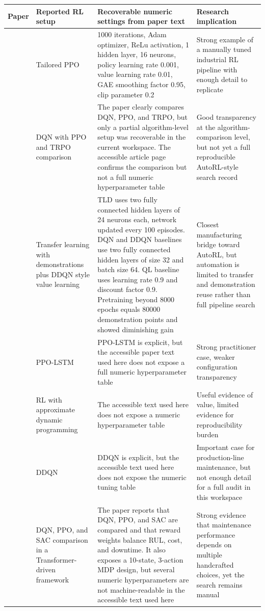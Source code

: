 \begin{table}[htbp]
\centering
\small
\begin{tabular}{p{} p{} p{} p{}}
\hline
Paper & Reported RL setup & Recoverable numeric settings from paper text & Research implication \\
\hline
[Hu24] & Tailored PPO & 1000 iterations, Adam optimizer, ReLu activation, 1 hidden layer, 16 neurons, policy learning rate 0.001, value learning rate 0.01, GAE smoothing factor 0.95, clip parameter 0.2 & Strong example of a manually tuned industrial RL pipeline with enough detail to replicate \\
[Net24] & DQN with PPO and TRPO comparison & The paper clearly compares DQN, PPO, and TRPO, but only a partial algorithm-level setup was recoverable in the current workspace. The accessible article page confirms the comparison but not a full numeric hyperparameter table & Good transparency at the algorithm-comparison level, but not yet a full reproducible AutoRL-style search record \\
[Ong22b] & Transfer learning with demonstrations plus DDQN style value learning & TLD uses two fully connected hidden layers of 24 neurons each, network updated every 100 episodes. DQN and DDQN baselines use two fully connected hidden layers of size 32 and batch size 64. QL baseline uses learning rate 0.9 and discount factor 0.9. Pretraining beyond 8000 epochs equals 80000 demonstration points and showed diminishing gain & Closest manufacturing bridge toward AutoRL, but automation is limited to transfer and demonstration reuse rather than full pipeline search \\
[Ong22] & PPO-LSTM & PPO-LSTM is explicit, but the accessible paper text used here does not expose a full numeric hyperparameter table & Strong practitioner case, weaker configuration transparency \\
[Fen22] & RL with approximate dynamic programming & The accessible text used here does not expose a numeric hyperparameter table & Useful evidence of value, limited evidence for reproducibility burden \\
[Hua20] & DDQN & DDQN is explicit, but the accessible text used here does not expose the numeric tuning table & Important case for production-line maintenance, but not enough detail for a full audit in this workspace \\
[Zha23d] & DQN, PPO, and SAC comparison in a Transformer-driven framework & The paper reports that DQN, PPO, and SAC are compared and that reward weights balance RUL, cost, and downtime. It also exposes a 10-state, 3-action MDP design, but several numeric hyperparameters are not machine-readable in the accessible text used here & Strong evidence that maintenance performance depends on multiple handcrafted choices, yet the search remains manual \\

\end{tabular}
\end{table}
